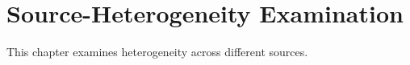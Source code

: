 
\chapter{Source-Heterogeneity Examination}

This chapter examines heterogeneity across different sources.

